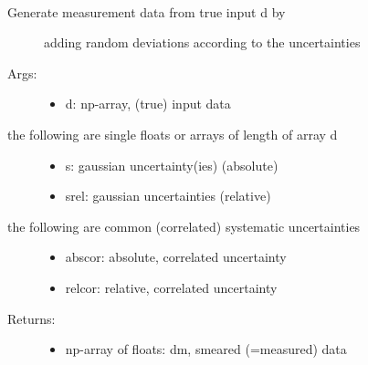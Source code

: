 \documentclass[letterpaper,10pt,english]{sphinxmanual}
\begin{document}
\begin{fulllineitems}
\label{\detokenize{index:PhyPraKit.PhyPraKit.smearData}}~\begin{description}
\item[{Generate measurement data from \sphinxquotedblleft{}true\sphinxquotedblright{} input d by}] \leavevmode
adding random deviations according to the uncertainties

\item[{Args:}] \leavevmode\begin{itemize}
\item {} 
d:  np-array, (true) input data

\end{itemize}

\item[{the following are single floats or arrays of length of array d}] \leavevmode\begin{itemize}
\item {} 
s: gaussian uncertainty(ies) (absolute)

\item {} 
srel: gaussian uncertainties (relative)

\end{itemize}

\item[{the following are common (correlated) systematic uncertainties}] \leavevmode\begin{itemize}
\item {} 
abscor: absolute, correlated uncertainty

\item {} 
relcor: relative, correlated uncertainty

\end{itemize}

\item[{Returns:}] \leavevmode\begin{itemize}
\item {} 
np-array of floats: dm, smeared (=measured) data

\end{itemize}

\end{description}

\end{fulllineitems}

\end{document}
